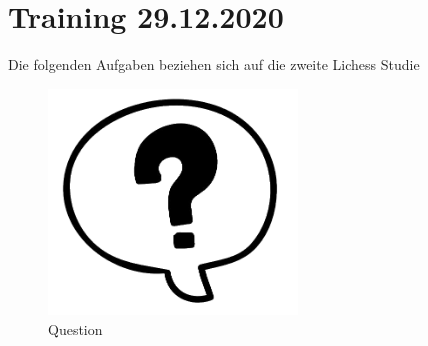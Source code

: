 \chapter{Training 29.12.2020}
 Die folgenden Aufgaben beziehen sich auf die zweite Lichess Studie \cite{Study2}

\vspace{5cm}
\hspace{2cm}

\begin{figure}[h]
	\centering
	\includegraphics[height=6cm]{question.png}
	\caption{Question}
	\label{fig:Question}
\end{figure}